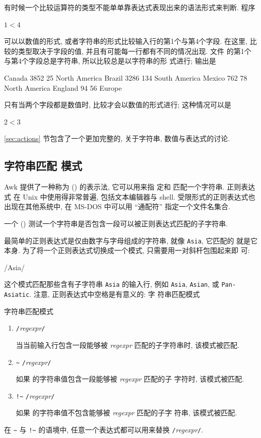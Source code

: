 有时候一个比较运算符的类型不能单单靠表达式表现出来的语法形式来判断. 程序
\begin{myverb}
    $1 < $4
\end{myverb}
可以以数值的形式, 或者字符串的形式比较输入行的第1个与第4个字段. 在这里,
比较的类型取决于字段的值, 并且有可能每一行都有不同的情况出现. 文件
 的第1个与第4个字段总是字符串, 所以比较总是以字符串的形
式进行; 输出是
\begin{myverb}
    Canada      3852    25      North America
    Brazil      3286    134     South America
    Mexico      762     78      North America
    England     94      56      Europe
\end{myverb}
只有当两个字段都是数值时, 比较才会以数值的形式进行; 这种情况可以是
\begin{myverb}
    $2 < $3
\end{myverb}

\ref{sec:actions} 节包含了一个更加完整的, 关于字符串, 数值与表达式的讨论.

\subsection{字符串匹配 模式}
\label{subsec:string_matching_pattern}

Awk 提供了一种称为  (\regexpr) 的表示法, 它可以用来指
定和
匹配一个字符串.  正则表达式 在 Unix 中使用得非常普遍, 包括文本编辑器与
shell. 受限形式的正则表达式也出现在其他系统中, 在 MS-DOS 中可以用
``通配符'' 指定一个文件名集合.

一个  ()
测试一个字符串是否包含一段可以被正则表达式匹配的子字符串.

最简单的正则表达式是仅由数字与字母组成的字符串, 就像 \verb'Asia', 它匹配的
就是它本身. 为了将一个正则表达式切换成一个模式, 只需要用一对斜杆包围起来即
可:
\begin{myverb}
    /Asia/
\end{myverb}
这个模式匹配那些含有子字符串 \verb'Asia' 的输入行, 例如 \verb'Asia',
\verb'Asian', 或 \verb'Pan-Asiatic'. 注意, 正则表达式中空格是有意义的: 字
符串匹配模式
\begin{summary}{字符串匹配模式}
    \begin{enumerate}
        \item \verb'/'\textit{regexpr}\verb'/' \par
            当当前输入行包含一段能够被 \textit{regexpr} 匹配的子字符串时,
            该模式被匹配.
        \item \regexpr {} \verb'~' \verb'/'\textit{regexpr}\verb'/' \par
            如果 \expr 的字符串值包含一段能够被 \textit{regexpr} 匹配的子
            字符时, 该模式被匹配.
        \item \expr {} \verb'!~' \verb'/'\textit{regexpr}\verb'/' \par
            如果 \expr 的字符串值不包含能够被 \textit{regexpr} 匹配的子字
            符串, 该模式被匹配.
    \end{enumerate}
    在 \verb'~' 与 \verb'!~' 的语境中, 任意一个表达式都可以用来替换
    \verb'/'\textit{regexpr}\verb'/'.
\end{summary}

